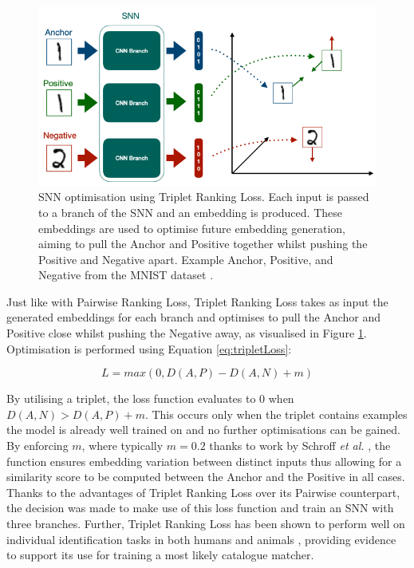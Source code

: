 \begin{figure}
	\begin{center}
		\includegraphics[scale=0.5]{Chapter5/figs/triplet-loss-eg.png}
	\end{center}
	\caption{SNN optimisation using Triplet Ranking Loss. Each input is passed to a branch of the SNN and an embedding is produced. These embeddings are used to optimise future embedding generation, aiming to pull the Anchor and Positive together whilst pushing the Positive and Negative apart. Example Anchor, Positive, and Negative from the MNIST dataset \cite{lecun_gradient-based_1998}.}
	\label{fig:triplet-loss-eg}
\end{figure}

Just like with Pairwise Ranking Loss, Triplet Ranking Loss takes as input the generated embeddings for each branch and optimises to pull the Anchor and Positive close whilst pushing the Negative away, as visualised in Figure \ref{fig:triplet-loss-eg}. Optimisation is performed using Equation \ref{eq:tripletLoss}:

\begin{equation}
	\label{eq:tripletLoss}
	L = max(0, D(A,P) - D(A,N) + m)
\end{equation}

By utilising a triplet, the loss function evaluates to 0 when $D(A, N) > D(A, P) + m$. This occurs only when the triplet contains examples the model is already well trained on and no further optimisations can be gained. By enforcing $m$, where typically $m = 0.2$ thanks to work by Schroff \textit{et al.} \cite{schroff_facenet_2015}, the function ensures embedding variation between distinct inputs thus allowing for a similarity score to be computed between the Anchor and the Positive in all cases. Thanks to the advantages of Triplet Ranking Loss over its Pairwise counterpart, the decision was made to make use of this loss function and train an SNN with three branches. Further, Triplet Ranking Loss has been shown to perform well on individual identification tasks in both humans \cite{hermans_defense_2017} and animals \cite{vetrova_hidden_2018}, providing evidence to support its use for training a most likely catalogue matcher.

